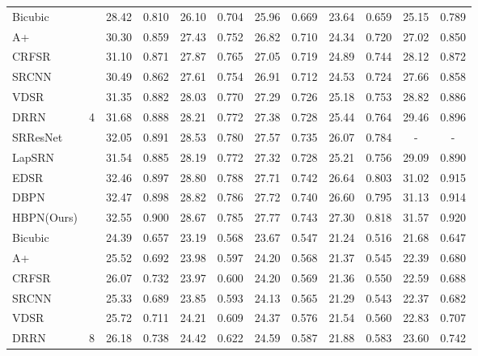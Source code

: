\documentclass[10pt,twocolumn,letterpaper]{article}
\begin{document}
\begin{table*}[t]
\begin{center}
\begin{small}
{\begin{tabular}{lccccccccccc}
Bicubic &  & 28.42 & 0.810 & 26.10 & 0.704 & 25.96 & 0.669 & 23.64 & 0.659 & 25.15 & 0.789 \\
A+~\cite{Timofte2015} &  & 30.30 & 0.859 & 27.43 & 0.752 & 26.82 & 0.710 & 24.34 & 0.720 & 27.02 & 0.850 \\
CRFSR~\cite{ICIP18} &  & 31.10 & 0.871 & 27.87 & 0.765 & 27.05 & 0.719 & 24.89 & 0.744 & 28.12 & 0.872 \\
SRCNN~\cite{SRCNN} &  & 30.49 & 0.862 & 27.61 & 0.754 & 26.91 & 0.712 & 24.53 & 0.724 & 27.66 & 0.858 \\
VDSR~\cite{VDSR} &  & 31.35 & 0.882 & 28.03 & 0.770 & 27.29 & 0.726 & 25.18 & 0.753 & 28.82 & 0.886 \\
DRRN~\cite{DRRN} & 4 & 31.68 & 0.888 & 28.21 & 0.772 & 27.38 & 0.728 & 25.44 & 0.764 & 29.46 & 0.896 \\
SRResNet~\cite{SRGAN} &  & 32.05 & 0.891 & 28.53 & 0.780 & 27.57 & 0.735 & 26.07 & 0.784 & - & - \\
LapSRN~\cite{LapSRN} &  & 31.54 & 0.885 & 28.19 & 0.772 & 27.32 & 0.728 & 25.21 & 0.756 & 29.09 & 0.890 \\
EDSR~\cite{EDSR} &  & 32.46 & 0.897 & {\color{blue}28.80} & {\color{red}0.788} & 27.71 & {\color{blue}0.742} & {\color{blue}26.64} & {\color{blue}0.803} & 31.02 & {\color{blue}0.915} \\
DBPN~\cite{DBPN} &  & {\color{blue}32.47} & {\color{blue}0.898} & {\color{red}28.82} & {\color{blue}0.786} & {\color{blue}27.72} & 0.740 & 26.60 & 0.795 & {\color{blue}31.13} & 0.914 \\
HBPN(Ours) &  & {\color{red}32.55} & {\color{red}0.900} & 28.67 & 0.785 & {\color{red}27.77} & {\color{red}0.743} & {\color{red}27.30} & {\color{red}0.818} & {\color{red}31.57} & {\color{red}0.920} \\ \hline
Bicubic &  & 24.39 & 0.657 & 23.19 & 0.568 & 23.67 & 0.547 & 21.24 & 0.516 & 21.68 & 0.647 \\
A+~\cite{Timofte2015} &  & 25.52 & 0.692 & 23.98 & 0.597 & 24.20 & 0.568 & 21.37 & 0.545 & 22.39 & 0.680 \\
CRFSR~\cite{ICIP18} &  & 26.07 & 0.732 & 23.97 & 0.600 & 24.20 & 0.569 & 21.36 & 0.550 & 22.59 & 0.688 \\
SRCNN~\cite{SRCNN} &  & 25.33 & 0.689 & 23.85 & 0.593 & 24.13 & 0.565 & 21.29 & 0.543 & 22.37 & 0.682 \\
VDSR~\cite{VDSR} &  & 25.72 & 0.711 & 24.21 & 0.609 & 24.37 & 0.576 & 21.54 & 0.560 & 22.83 & 0.707 \\
DRRN~\cite{DRRN} & 8 & 26.18 & 0.738 & 24.42 & 0.622 & 24.59 & 0.587 & 21.88 & 0.583 & 23.60 & 0.742 \\

\end{tabular}}
\end{small}
\end{center}
\end{table*}
\end{document}
